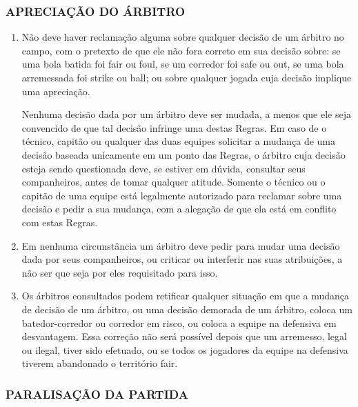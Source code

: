 \begin{multicols}{2}
	\subsubsection{APRECIA\c{C}ÃO DO \'ARBITRO }
	
	\begin{enumerate}[label=\alph*)]
		\item N\~ao deve haver reclama\c{c}\~ao alguma sobre qualquer decis\~ao de um \'arbitro no campo, com o pretexto de que ele n\~ao fora correto em sua decis\~ao sobre: 
		se uma bola batida foi \gls{fair} ou \gls{foul}, se um corredor foi \gls{safe} ou \gls{out}, se uma bola arremessada foi \gls{strike} ou \gls{ball}; 
		ou sobre qualquer jogada cuja decis\~ao implique uma aprecia\c{c}\~ao. 
		
		Nenhuma decis\~ao dada por um \'arbitro deve ser mudada, a menos que ele seja convencido de que tal decis\~ao infringe uma destas Regras. 
		Em caso de o t\'ecnico, capit\~ao ou qualquer das duas equipes solicitar a mudan\c{c}a de uma decis\~ao baseada unicamente em um ponto das Regras, o \'arbitro cuja decis\~ao esteja sendo questionada deve, se estiver em d\'uvida, consultar seus companheiros, antes de tomar qualquer atitude. Somente o t\'ecnico ou o capit\~ao de uma equipe est\'a legalmente autorizado para reclamar sobre uma decis\~ao e pedir a sua mudan\c{c}a, com a alega\c{c}\~ao de que ela est\'a em conflito com estas Regras. 
		
		\item  Em nenhuma circunst\^ancia um \'arbitro deve pedir para mudar uma decis\~ao dada por seus companheiros, ou criticar ou interferir nas suas atribui\c{c}\~oes, a n\~ao ser que seja por eles requisitado para isso. 
		\item  Os \'arbitros consultados podem retificar qualquer situa\c{c}\~ao em que a mudan\c{c}a de decis\~ao de um \'arbitro, ou uma decis\~ao demorada de um \'arbitro, coloca um batedor-corredor ou corredor em risco, ou coloca a equipe na defensiva em desvantagem. Essa corre\c{c}\~ao n\~ao ser\'a poss\'ivel depois que um arremesso, legal ou ilegal, tiver sido efetuado, ou se todos os jogadores da equipe na defensiva tiverem abandonado o territ\'orio \gls{fair}. 
	\end{enumerate}
	
	\subsubsection{PARALISA\c{C}ÃO DA PARTIDA} 
	

\end{multicols}
